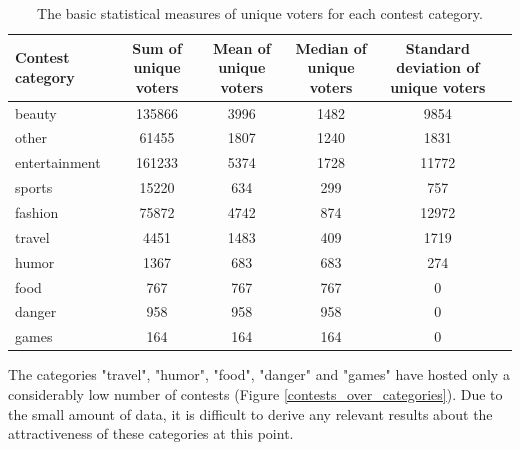    \begin{table}[]
        \centering
        \begin{adjustbox}{width=1\textwidth}
            \begin{tabular}{l|c|c|c|c|c}
                \textbf{Contest category} & \textbf{Sum of unique voters} & \textbf{Mean of unique voters} & \textbf{Median of unique voters} & \textbf{Standard deviation of unique voters} \\
                \hline
                beauty & 135866 & 3996 & 1482 & 9854 \\
                other & 61455 & 1807 & 1240 & 1831 \\
                entertainment & 161233 & 5374 & 1728 & 11772 \\
                sports & 15220 & 634 & 299 & 757 \\
                fashion & 75872 & 4742 & 874 & 12972 \\
                travel & 4451 & 1483 & 409 & 1719 \\
                humor & 1367 & 683 & 683 & 274 \\
                food & 767 & 767 & 767 & 0 \\
                danger & 958 & 958 & 958 & 0 \\
                games & 164 & 164 & 164 & 0
            \end{tabular}
        \end{adjustbox}
        \caption{The basic statistical measures of unique voters for each contest category.}
        \label{user_engagement_over_categories}
    \end{table}
    
    The categories "travel", "humor", "food", "danger" and "games" have hosted only a considerably low number of contests (Figure \ref{contests_over_categories}). Due to the small amount of data, it is difficult to derive any relevant results about the attractiveness of these categories at this point. 
    


